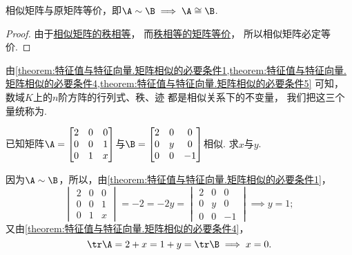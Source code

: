\begin{property}
相似矩阵与原矩阵等价，即\(\A\sim\B \implies \A\cong\B\).
\begin{proof}
由于\hyperref[theorem:特征值与特征向量.矩阵相似的必要条件5]{相似矩阵的秩相等}，
而\hyperref[theorem:矩阵乘积的秩.矩阵等价的充分必要条件]{秩相等的矩阵等价}，
所以相似矩阵必定等价.
\end{proof}
\end{property}

\begin{remark}
由\cref{theorem:特征值与特征向量.矩阵相似的必要条件1,theorem:特征值与特征向量.矩阵相似的必要条件4,theorem:特征值与特征向量.矩阵相似的必要条件5} 可知，
数域\(K\)上的\(n\)阶方阵的行列式、秩、迹
都是相似关系下的不变量，
我们把这三个量统称为.
\end{remark}

\begin{example}
已知矩阵\(\A = \begin{bmatrix}
	2 & 0 & 0 \\
	0 & 0 & 1 \\
	0 & 1 & x
\end{bmatrix}\)与\(\B = \begin{bmatrix}
	2 & 0 & 0 \\
	0 & y & 0 \\
	0 & 0 & -1
\end{bmatrix}\)相似.
求\(x\)与\(y\).
\begin{solution}
因为\(\A\sim\B\)，所以，由\cref{theorem:特征值与特征向量.矩阵相似的必要条件1}，
\[
	\begin{vmatrix}
		2 & 0 & 0 \\
		0 & 0 & 1 \\
		0 & 1 & x
	\end{vmatrix}
	= -2 = -2y =
	\begin{vmatrix}
		2 & 0 & 0 \\
		0 & y & 0 \\
		0 & 0 & -1
	\end{vmatrix}
	\implies y = 1;
\]
又由\cref{theorem:特征值与特征向量.矩阵相似的必要条件4}，
\[
	\tr\A = 2+x
	= 1+y = \tr\B
	\implies
	x = 0.
\]
\end{solution}
\end{example}

